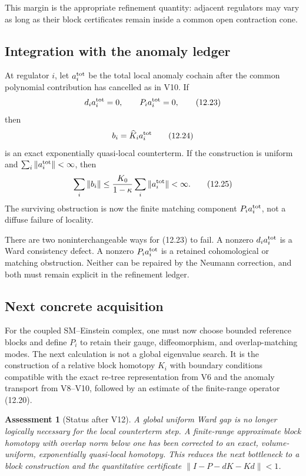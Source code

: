 \documentclass[11pt]{article}
\newtheorem{assessment}[theorem]{Assessment}
\theoremstyle{remark}
\begin{document}
This margin is the appropriate refinement quantity: adjacent
regulators may vary as long as their block certificates remain
inside a common open contraction cone.

\subsection{Integration with the anomaly ledger}

At regulator \(i\), let \(a_i^{\rm tot}\) be the total local anomaly
cochain after the common polynomial contribution has cancelled as in
V10.  If
\[
 d_i a_i^{\rm tot}=0,\qquad P_i a_i^{\rm tot}=0,            \tag{12.23}
\]
then
\[
                  b_i=\widehat K_i a_i^{\rm tot}            \tag{12.24}
\]
is an exact exponentially quasi-local counterterm.  If the
construction is uniform and
\(\sum_i\|a_i^{\rm tot}\|<\infty\), then
\[
 \sum_i\|b_i\|
 \le\frac{K_0}{1-\kappa}
       \sum_i\|a_i^{\rm tot}\|<\infty.                      \tag{12.25}
\]
The surviving obstruction is now the finite matching component
\(P_i a_i^{\rm tot}\), not a diffuse failure of locality.

There are two noninterchangeable ways for (12.23) to fail.
A nonzero \(d_i a_i^{\rm tot}\) is a Ward consistency defect.
A nonzero \(P_i a_i^{\rm tot}\) is a retained cohomological or
matching obstruction.  Neither can be repaired by the Neumann
correction, and both must remain explicit in the refinement ledger.

\subsection{Next concrete acquisition}

For the coupled SM--Einstein complex, one must now choose bounded
reference blocks and define \(P_i\) to retain their gauge,
diffeomorphism, and overlap-matching modes.  The next calculation is
not a global eigenvalue search.  It is the construction of a
relative block homotopy \(K_i\) with boundary conditions compatible
with the exact re-tree representation from V6 and the anomaly
transport from V8--V10, followed by an estimate of the finite-range
operator (12.20).

\begin{assessment}[Status after V12]
\label{ass:v12v12-status}
A global uniform Ward gap is no longer logically necessary for the
local counterterm step.  A finite-range approximate block homotopy
with overlap norm below one has been corrected to an exact,
volume-uniform, exponentially quasi-local homotopy.  This reduces the
next bottleneck to a block construction and the quantitative
certificate \(\|I-P-dK-Kd\|<1\).
\end{assessment}
\end{document}
